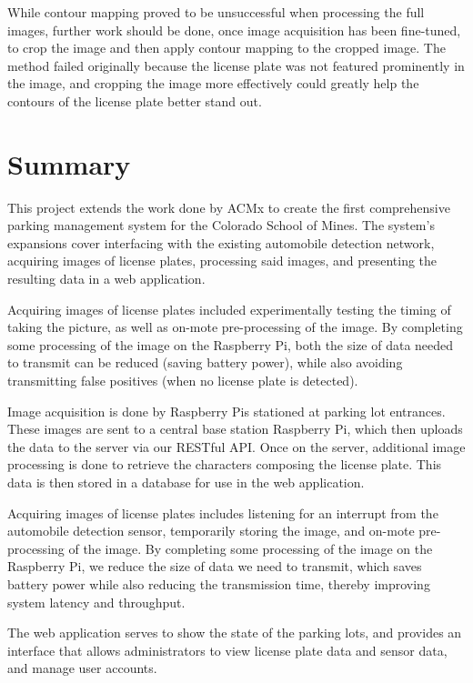 \documentclass[11pt, oneside, fullpage, doublespace]{article}
\begin{document}
While contour mapping proved to be unsuccessful when processing the full images, further work should be done, once image acquisition has been fine-tuned, to crop the image and then apply contour mapping to the cropped image. The method failed originally because the license plate was not featured prominently in the image, and cropping the image more effectively could greatly help the contours of the license plate better stand out.

\section{Summary}

This project extends the work done by ACMx to create the first comprehensive parking management system for the Colorado School of Mines. The system's expansions cover interfacing with the existing automobile detection network, acquiring images of license plates, processing said images, and presenting the resulting data in a web application.

Acquiring images of license plates included experimentally testing the timing of taking the picture, as well as on-mote pre-processing of the image. By completing some processing of the image on the Raspberry Pi, both the size of data needed to transmit can be reduced (saving battery power), while also avoiding transmitting false positives (when no license plate is detected).

Image acquisition is done by Raspberry Pis stationed at parking lot entrances. These images are sent to a central base station Raspberry Pi, which then uploads the data to the server via our RESTful API. Once on the server, additional image processing is done to retrieve the characters composing the license plate. This data is then stored in a database for use in the web application.

Acquiring images of license plates includes listening for an interrupt from the automobile detection sensor, temporarily storing the image, and on-mote pre-processing of the image. By completing some processing of the image on the Raspberry Pi, we reduce the size of data we need to transmit, which saves battery power while also reducing the transmission time, thereby improving system latency and throughput.

The web application serves to show the state of the parking lots, and provides an interface that allows administrators to view license plate data and sensor data, and manage user accounts.
\end{document}
